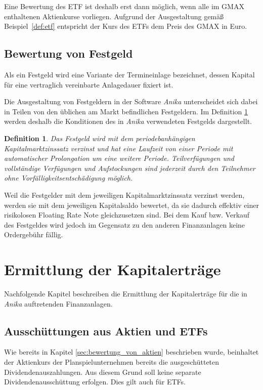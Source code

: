 \documentclass[12pt, a4paper]{article}
\theoremstyle{plain}
\newtheorem{definition}{Definition}
\begin{document}
Eine Bewertung des \gls{ETF} ist deshalb erst dann möglich, wenn alle im \gls{GMAX} enthaltenen Aktienkurse vorliegen. Aufgrund der Ausgestaltung gemäß Beispiel~\ref{def:etf} entspricht der Kurs des \glspl{ETF} dem Preis des \gls{GMAX} in Euro. 

\subsection{Bewertung von Festgeld}
\label{sec:bewertung_von_festgeldern}

Als ein Festgeld wird eine Variante der Termineinlage bezeichnet, dessen Kapital für eine vertraglich vereinbarte Anlagedauer fixiert ist.

Die Ausgestaltung von Festgeldern in der Software \textit{Anika} unterscheidet sich dabei in Teilen von den üblichen am Markt befindlichen Festgeldern. Im Definition \ref{def:festgeld} werden deshalb die Konditionen des in \textit{Anika} verwendeten Festgelds dargestellt.

\begin{definition}
	\label{def:festgeld}
	Das Festgeld wird mit dem periodebanhängigen Kapitalmarktzinssatz verzinst und hat eine Laufzeit von einer Periode mit automatischer Prolongation um eine weitere Periode. Teilverfügungen und vollständige Verfügungen und Aufstockungen sind jederzeit durch den Teilnehmer ohne Vorfälligkeitsentschädigung möglich. 
\end{definition}

Weil die Festgelder mit dem jeweiligen Kapitalmarktzinssatz verzinst werden, werden sie mit dem jeweiligen Kapitalsaldo bewertet, da sie dadurch effektiv einer risikolosen Floating Rate Note gleichzusetzen sind. Bei dem Kauf bzw. Verkauf des Festgeldes wird jedoch im Gegensatz zu den anderen Finanzanlagen keine Ordergebühr fällig.

\section{Ermittlung der Kapitalerträge}
\label{sec:ermittlung_von_wertpapierertraegen}

Nachfolgende Kapitel beschreiben die Ermittlung der Kapitalerträge für die in \textit{Anika} auftretenden Finanzanlagen.

\subsection{Ausschüttungen aus Aktien und ETFs}
\label{sec:ausschuettung_aus_aktie}
Wie bereits in Kapitel \ref{sec:bewertung_von_aktien} beschrieben wurde, beinhaltet der Aktienkurs der Planspielunternehmen bereits die ausgeschütteten Dividendenauszahlungen. Aus diesem Grund soll keine separate Dividendenausschüttung erfolgen. Dies gilt auch für \glspl{ETF}.
\end{document}
